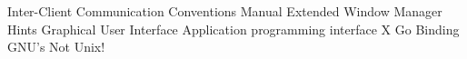 {Inter-Client Communication Conventions Manual}
 {Extended Window Manager Hints}
 {Graphical User Interface}
 {Application programming interface}
 {X Go Binding}
 {GNU's Not Unix!}

